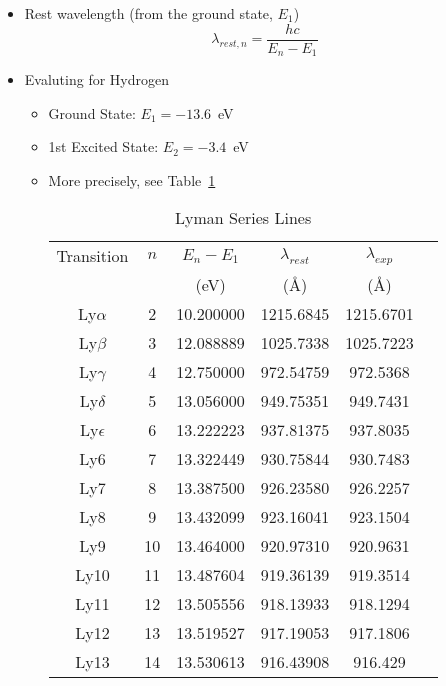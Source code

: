 \documentclass[12pt,letterpaper]{article}
\begin{document}
\begin{Aenumerate}
\begin{itemize}
\begin{itemize}
    \item Rest wavelength (from the ground state, $E_1$)
    \begin{equation}
    \lambda_{rest,n} = \frac{hc}{E_n - E_1}
    \label{eqn:lrest}
    \end{equation}

    \item Evaluting for Hydrogen
	\begin{itemize}
	\item Ground State:  $E_1 = -13.6$~eV
	\item 1st Excited State:  $E_2 = -3.4$~eV
	\item More precisely, see Table~\ref{tab:energies}

\begin{table}[ht]
\begin{center}
\caption{Lyman Series Lines \label{tab:energies}}
\begin{tabular}{cccccc}
\hline
Transition & $n$ & $E_n - E_1$ & $\lambda_{rest}$ & $\lambda_{exp}$ \\
& & (eV) & (\AA) & (\AA) \\
\hline
Ly$\alpha$&           2&       10.200000&       1215.6845& 1215.6701 \\
Ly$\beta$&            3&       12.088889&       1025.7338& 1025.7223\\
Ly$\gamma$&           4&       12.750000&       972.54759&  972.5368\\
Ly$\delta$&           5&       13.056000&       949.75351&  949.7431\\
Ly$\epsilon$&         6&       13.222223&       937.81375&  937.8035\\
Ly6&                  7&       13.322449&       930.75844&  930.7483\\
Ly7&                  8&       13.387500&       926.23580&  926.2257\\
Ly8&                  9&       13.432099&       923.16041&  923.1504\\
Ly9&                  10&       13.464000&       920.97310& 920.9631\\
Ly10&                 11&       13.487604&       919.36139& 919.3514\\
Ly11&                 12&       13.505556&       918.13933& 918.1294\\
Ly12&                 13&       13.519527&       917.19053& 917.1806\\
Ly13&                 14&       13.530613&       916.43908& 916.429\\

\end{tabular}
\end{center}
\end{table}
\end{itemize}
\end{itemize}
\end{itemize}
\end{Aenumerate}
\end{document}
